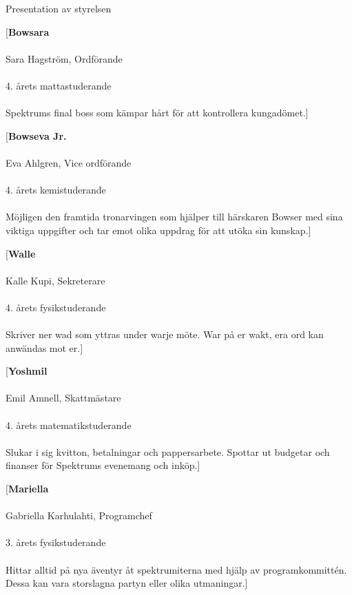 \documentclass{spektraklet}
\begin{document}
\begin{artikel}{Presentation av styrelsen}{}
\begin{twocolumns}

[\textbf{Bowsara} \\ \\ Sara Hagström, Ordförande \\ \\ 4. årets mattastuderande \\ \\ Spektrums final boss som kämpar hårt för att kontrollera kungadömet.]

\columnbreak

[\textbf{Bowseva Jr.} \\ \\ Eva Ahlgren, Vice ordförande \\ \\ 4. årets kemistuderande \\ \\ Möjligen den framtida tronarvingen som hjälper till härskaren Bowser med sina viktiga uppgifter och tar emot  olika uppdrag för att utöka sin kunskap.]

\columnbreak

[\textbf{Walle} \\ \\ Kalle Kupi, Sekreterare \\ \\ 4. årets fysikstuderande \\ \\ Skriver ner wad som yttras under warje möte. War på er wakt, era ord kan anwändas mot er.]

\columnbreak

[\textbf{Yoshmil} \\ \\ Emil Amnell, Skattmästare \\ \\ 4. årets matematikstuderande \\ \\ Slukar i sig kvitton, betalningar och pappersarbete. Spottar ut budgetar och finanser för Spektrums evenemang och inköp.]

\columnbreak

[\textbf{Mariella} \\ \\ Gabriella Karhulahti, Programchef \\ \\ 3. årets fysikstuderande \\ \\ Hittar alltid på nya äventyr åt spektrumiterna med hjälp av programkommittén. Dessa kan vara storslagna partyn eller olika utmaningar.]


\end{twocolumns}
\end{artikel}
\end{document}
